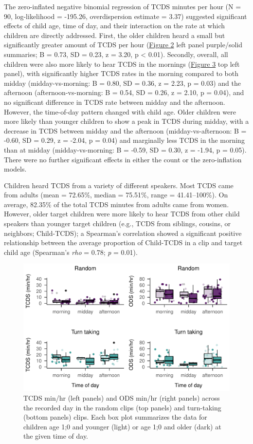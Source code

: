 \documentclass[
  english,
  ,man,floatsintext]{apa6}
\begin{document}
The zero-inflated negative binomial regression of TCDS minutes per hour (N = 90, log-likelihood = -195.26, overdispersion estimate = 3.37) suggested significant effects of child age, time of day, and their interaction on the rate at which children are directly addressed. First, the older children heard a small but significantly greater amount of TCDS per hour (\protect\hyperlink{fig2}{Figure 2} left panel purple/solid summaries; B = 0.73, SD = 0.23, z = 3.20, p \textless{} 0.01). Secondly, overall, all children were also more likely to hear TCDS in the mornings (\protect\hyperlink{fig3}{Figure 3} top left panel), with significantly higher TCDS rates in the morning compared to both midday (midday-vs-morning: B = 0.80, SD = 0.36, z = 2.23, p = 0.03) and the afternoon (afternoon-vs-morning: B = 0.54, SD = 0.26, z = 2.10, p = 0.04), and no significant difference in TCDS rate between midday and the afternoon. However, the time-of-day pattern changed with child age. Older children were more likely than younger children to show a peak in TCDS during midday, with a decrease in TCDS between midday and the afternoon (midday-vs-afternoon: B = -0.60, SD = 0.29, z = -2.04, p = 0.04) and marginally less TCDS in the morning than at midday (midday-vs-morning: B = -0.59, SD = 0.30, z = -1.94, p = 0.05). There were no further significant effects in either the count or the zero-inflation models.

Children heard TCDS from a variety of different speakers. Most TCDS came from adults (mean = 72.65\%, median = 75.51\%, range = 41.41--100\%). On average, 82.35\% of the total TCDS minutes from adults came from women. However, older target children were more likely to hear TCDS from other child speakers than younger target children (e.g., TCDS from siblings, cousins, or neighbors; Child-TCDS); a Spearman's correlation showed a significant positive relationship between the average proportion of Child-TCDS in a clip and target child age (Spearman's \emph{rho} = 0.78; \emph{p} = 0.01).

\begin{figure}
\centering
\includegraphics{Yeli-CLE_files/figure-latex/fig3-1.pdf}
\caption{\label{fig:fig3}TCDS min/hr (left panels) and ODS min/hr (right panels) across the recorded day in the random clips (top panels) and turn-taking (bottom panels) clips. Each box plot summarizes the data for children age 1;0 and younger (light) or age 1;0 and older (dark) at the given time of day.}
\end{figure}
\end{document}
